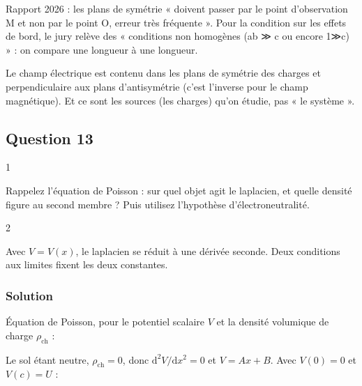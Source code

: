 \documentclass[11pt,a4paper]{article}
\newcommand{\equationajustee}[1]{%
  \sbox{\boiteequation}{$\displaystyle #1$}%
  \ifdim\wd\boiteequation>\linewidth
    \[\resizebox{\linewidth}{!}{\usebox{\boiteequation}}\]%
  \else
    \[#1\]%
  \fi}
\begin{document}
\begin{piege}

Rapport 2026 : les plans de symétrie « doivent passer par le point d'observation M et non par le point O, erreur très fréquente ». Pour la condition sur les effets de bord, le jury relève des « conditions non homogènes (ab ≫ c ou encore 1≫c) » : on compare une longueur à une longueur.

\end{piege}

\begin{piege}

Le champ électrique est contenu dans les plans de symétrie des charges et perpendiculaire aux plans d'antisymétrie (c'est l'inverse pour le champ magnétique). Et ce sont les sources (les charges) qu'on étudie, pas « le système ».

\end{piege}

\hypertarget{question-13}{%
\subsection{Question 13}\label{question-13}}

\begin{indication}{1}

Rappelez l'équation de Poisson : sur quel objet agit le laplacien, et quelle densité figure au second membre ? Puis utilisez l'hypothèse d'électroneutralité.

\end{indication}

\begin{indication}{2}

Avec \(V=V(x)\), le laplacien se réduit à une dérivée seconde. Deux conditions aux limites fixent les deux constantes.

\end{indication}

\hypertarget{solution-12}{%
\subsubsection{Solution}\label{solution-12}}

Équation de Poisson, pour le potentiel scalaire \(V\) et la densité volumique de charge \(\rho_{\text{ch}}\) :

\equationajustee{\Delta V+\frac{\rho_{\text{ch}}}{\varepsilon_0}=0}

Le sol étant neutre, \(\rho_{\text{ch}}=0\), donc \(\mathrm d^2V/\mathrm dx^2=0\) et \(V=Ax+B\). Avec \(V(0)=0\) et \(V(c)=U\) :
\end{document}
